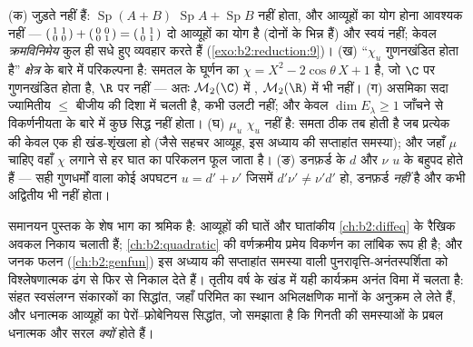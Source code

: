 \begin{remark}[सामान्य भूलें]\label{rem:b2:reduction:pitfalls}
(क)  जुड़ते नहीं हैं: $\operatorname{Sp}(A + B)$ $\operatorname{Sp}A + \operatorname{Sp}B$ नहीं होता, और 
आव्यूहों का योग  होना आवश्यक नहीं --- $\begin{psmallmatrix}1 & 1\\ 0 & 0\end{psmallmatrix} +
\begin{psmallmatrix}0 & 0\\ 0 & 1\end{psmallmatrix} =
\begin{psmallmatrix}1 & 1\\ 0 & 1\end{psmallmatrix}$ दो 
आव्यूहों का योग है (दोनों के  भिन्न हैं) और स्वयं
 नहीं; केवल \emph{क्रमविनिमेय} कुल ही सधे हुए व्यवहार करते हैं
(\cref{exo:b2:reduction:9})। (ख) ``$\chi_u$ गुणनखंडित होता है'' \emph{क्षेत्र} के बारे में
परिकल्पना है: समतल के घूर्णन का $\chi =
X^2 - 2\cos\theta\,X + 1$ है, जो $\C$ पर गुणनखंडित होता है,
$\R$ पर नहीं --- अतः $\mathcal{M}_2(\C)$ में , $\mathcal{M}_2(\R)$ में  भी नहीं।
(ग) असमिका सदा ज्यामितीय $\leq$ बीजीय की दिशा में चलती है, कभी उलटी
नहीं; और केवल $\dim E_\lambda \geq
1$ जाँचने से विकर्णनीयता के बारे में कुछ सिद्ध नहीं
होता। (घ) $\mu_u$ $\chi_u$ नहीं है: समता ठीक तब होती है जब प्रत्येक
 की केवल एक ही खंड-शृंखला हो (जैसे सहचर आव्यूह, इस अध्याय
की सप्ताहांत समस्या); और जहाँ $\mu$ चाहिए वहाँ $\chi$ लगाने से हर घात का
परिकलन फूल जाता है। (ङ) डनफ़र्ड के $d$ और $\nu$ $u$ के बहुपद होते हैं
--- सही गुणधर्मों वाला कोई अपघटन $u = d' + \nu'$ जिसमें $d'\nu' \neq \nu'd'$ हो, डनफ़र्ड
\emph{नहीं} है और कभी अद्वितीय भी नहीं होता।
\end{remark}

\begin{remark}[यह अध्याय कहाँ काम आता है]
समानयन पुस्तक के शेष भाग का श्रमिक है: आव्यूहों की घातें और घातांकीय
\cref{ch:b2:diffeq} के रैखिक अवकल निकाय चलाती हैं; \cref{ch:b2:quadratic} की वर्णक्रमीय प्रमेय विकर्णन का
लांबिक रूप ही है; और जनक फलन (\cref{ch:b2:genfun}) इस अध्याय की सप्ताहांत समस्या वाली
पुनरावृत्ति-अनंतस्पर्शिता को विश्लेषणात्मक ढंग से फिर से निकाल देते
हैं। तृतीय वर्ष के खंड में यही कार्यक्रम अनंत विमा में चलता है: संहत
स्वसंलग्न संकारकों का  सिद्धांत, जहाँ परिमित  का स्थान
अभिलक्षणिक मानों के अनुक्रम ले लेते हैं, और धनात्मक आव्यूहों का
पेरों--फ्रोबेनियस सिद्धांत, जो समझाता है कि गिनती की समस्याओं के प्रबल
 धनात्मक और सरल \emph{क्यों} होते हैं।
\end{remark}

